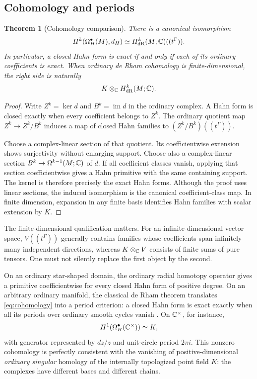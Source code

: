 \documentclass[11pt,letterpaper]{article}
\newtheorem{theorem}{Theorem}[section]
\theoremstyle{definition}
\theoremstyle{remark}
\numberwithin{equation}{section}
\begin{document}
\subsection{Cohomology and periods}
\begin{theorem}[Cohomology comparison]\label{thm:cohomology}
There is a canonical isomorphism
\begin{equation}\label{eq:cohomology}
 H^k(\Omega_H^\bullet(M),d_H)
 \simeq H^k_{\mathrm{dR}}(M;\mathbb C)((t^\Gamma)).
\end{equation}
In particular, a closed Hahn form is exact if and only if each of its ordinary coefficients is exact. When ordinary de Rham cohomology is finite-dimensional, the right side is naturally
\[
 K\otimes_\mathbb C H^k_{\mathrm{dR}}(M;\mathbb C).
\]
\end{theorem}
\begin{proof}
Write $Z^k=\ker d$ and $B^k=\operatorname{im}d$ in the ordinary complex. A Hahn form is closed exactly when every coefficient belongs to $Z^k$. The ordinary quotient map $Z^k\to Z^k/B^k$ induces a map of closed Hahn families to $(Z^k/B^k)((t^\Gamma))$.

Choose a complex-linear section of that quotient. Its coefficientwise extension shows surjectivity without enlarging support. Choose also a complex-linear section $B^k\to\Omega^{k-1}(M;\mathbb C)$ of $d$. If all coefficient classes vanish, applying that section coefficientwise gives a Hahn primitive with the same containing support. The kernel is therefore precisely the exact Hahn forms. Although the proof uses linear sections, the induced isomorphism is the canonical coefficient-class map. In finite dimension, expansion in any finite basis identifies Hahn families with scalar extension by $K$.
\end{proof}

The finite-dimensional qualification matters. For an infinite-dimensional vector space, $V((t^\Gamma))$ generally contains families whose coefficients span infinitely many independent directions, whereas $K\otimes_\mathbb C V$ consists of finite sums of pure tensors. One must not silently replace the first object by the second.

On an ordinary star-shaped domain, the ordinary radial homotopy operator gives a primitive coefficientwise for every closed Hahn form of positive degree. On an arbitrary ordinary manifold, the classical de Rham theorem translates \eqref{eq:cohomology} into a period criterion: a closed Hahn form is exact exactly when all its periods over ordinary smooth cycles vanish \cite{Lee}. On $\mathbb C^\times$, for instance,
\[
 H^1(\Omega_H^\bullet(\mathbb C^\times))\simeq K,
\]
with generator represented by $dz/z$ and unit-circle period $2\pi i$. This nonzero cohomology is perfectly consistent with the vanishing of positive-dimensional \emph{ordinary singular} homology of the internally topologized point field $K$: the complexes have different bases and different chains.
\end{document}
